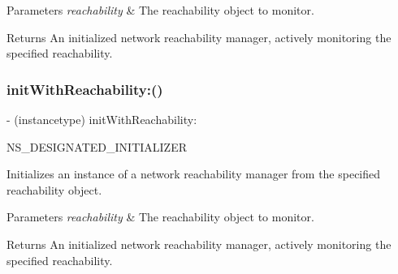 \begin{DoxyParams}{Parameters}
{\em reachability} & The reachability object to monitor.\\
\hline
\end{DoxyParams}
\begin{DoxyReturn}{Returns}
An initialized network reachability manager, actively monitoring the specified reachability. 
\end{DoxyReturn}
\mbox{\label{interface_a_f_network_reachability_manager_a14b6db66e80c81c86cb698e98f991392}} 
\subsubsection{\texorpdfstring{init\+With\+Reachability\+:()}{initWithReachability:()}\hspace{0.1cm}{\footnotesize\ttfamily [2/3]}}
{\footnotesize\ttfamily -\/ (instancetype) init\+With\+Reachability\+: \begin{DoxyParamCaption}\item[{(S\+C\+Network\+Reachability\+Ref)}]{N\+S\+\_\+\+D\+E\+S\+I\+G\+N\+A\+T\+E\+D\+\_\+\+I\+N\+I\+T\+I\+A\+L\+I\+Z\+ER }\end{DoxyParamCaption}}

Initializes an instance of a network reachability manager from the specified reachability object.


\begin{DoxyParams}{Parameters}
{\em reachability} & The reachability object to monitor.\\
\hline
\end{DoxyParams}
\begin{DoxyReturn}{Returns}
An initialized network reachability manager, actively monitoring the specified reachability. 
\end{DoxyReturn}
\mbox{\label{interface_a_f_network_reachability_manager_a14b6db66e80c81c86cb698e98f991392}} 
